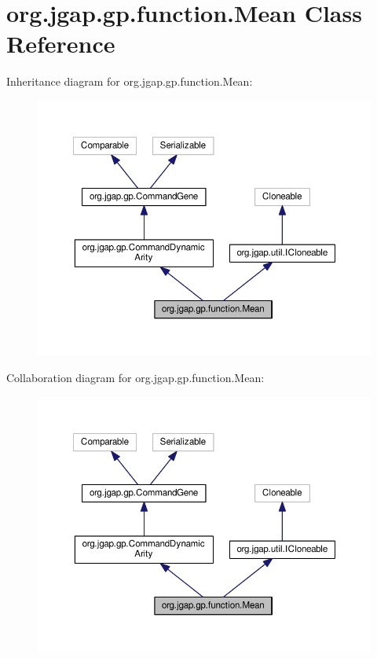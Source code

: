 \hypertarget{classorg_1_1jgap_1_1gp_1_1function_1_1_mean}{\section{org.\-jgap.\-gp.\-function.\-Mean Class Reference}
\label{classorg_1_1jgap_1_1gp_1_1function_1_1_mean}
}


Inheritance diagram for org.\-jgap.\-gp.\-function.\-Mean\-:
\nopagebreak
\begin{figure}[H]
\begin{center}
\leavevmode
\includegraphics[width=350pt]{classorg_1_1jgap_1_1gp_1_1function_1_1_mean__inherit__graph}
\end{center}
\end{figure}


Collaboration diagram for org.\-jgap.\-gp.\-function.\-Mean\-:
\nopagebreak
\begin{figure}[H]
\begin{center}
\leavevmode
\includegraphics[width=350pt]{classorg_1_1jgap_1_1gp_1_1function_1_1_mean__coll__graph}
\end{center}
\end{figure}
